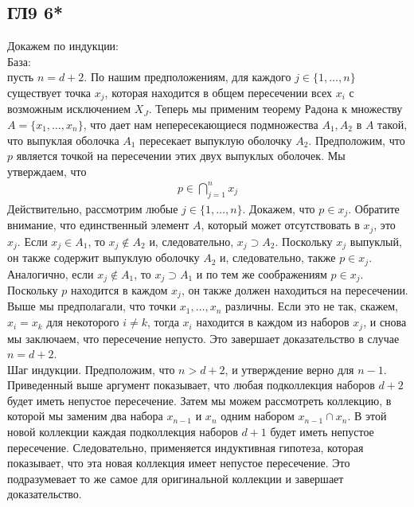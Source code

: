 \subsection*{ГЛ9 6*}
Докажем по индукции:\\
База:\\
пусть $n = d + 2$. По нашим предположениям, для каждого $j \in \{1, \ldots, n\} $ существует точка $x_{j}$, которая находится в общем пересечении всех $x_{i}$ с возможным исключением $X_{J}$. Теперь мы применим теорему Радона к множеству $A = \{x_{1}, \ldots, x_{n}\} $, что дает нам непересекающиеся подмножества $A_{1}, A_{2}$ в $A$ такой, что выпуклая оболочка $A_{1}$ пересекает выпуклую оболочку $A_{2}$. Предположим, что $p$ является точкой на пересечении этих двух выпуклых оболочек. Мы утверждаем, что
\begin{gather*}
	p\in\bigcap_{j=1}^n x_j
\end{gather*}
Действительно, рассмотрим любые $j \in \{1, \ldots, n\} $. Докажем, что $p \in x_{j}$. Обратите внимание, что единственный элемент $A$, который может отсутствовать в $x_{j}$, это $x_{j}$. Если $x_{j} \in A_{1}$, то $x_{j} \notin A_{2}$ и, следовательно, $x_{j} \supset A_{2}$. Поскольку $x_{j}$ выпуклый, он также содержит выпуклую оболочку $A_{2}$ и, следовательно, также $p \in x_{j}$. Аналогично, если $x_{j} \notin A_{1}$, то $x_{j} \supset A_{1}$ и по тем же соображениям $p \in x_{j}$. Поскольку $p$ находится в каждом $x_{j}$, он также должен находиться на пересечении.\\
		
Выше мы предполагали, что точки $x_{1}, \ldots, x_{n} $ различны. Если это не так, скажем, $x_{i} = x_{k} $ для некоторого $i \ne k$, тогда $x_{i}$ находится в каждом из наборов $x_{j}$, и снова мы заключаем, что пересечение непусто. Это завершает доказательство в случае $n = d + 2$. \\
		
Шаг индукции. Предположим, что $n > d + 2$, и утверждение верно для $n - 1$. Приведенный выше аргумент показывает, что любая подколлекция наборов $d + 2$ будет иметь непустое пересечение. Затем мы можем рассмотреть коллекцию, в которой мы заменим два набора $x_{n - 1}$ и $x_{n}$ одним набором $x_{n - 1} \cap x_{n}$. В этой новой коллекции каждая подколлекция наборов $d + 1$ будет иметь непустое пересечение. Следовательно, применяется индуктивная гипотеза, которая показывает, что эта новая коллекция имеет непустое пересечение. Это подразумевает то же самое для оригинальной коллекции и завершает доказательство.
		